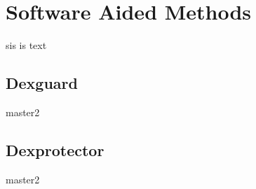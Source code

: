 \section{Software Aided Methods}\label{section:software}
sis is text

\subsection{Dexguard}\label{subsection:software-dexguard}
master2

\subsection{Dexprotector}\label{subsection:software-dexprotector}
master2

